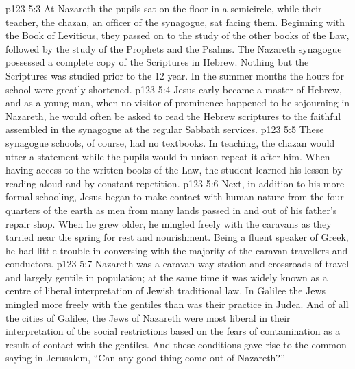 \vs p123 5:3 \pc At Nazareth the pupils sat on the floor in a semicircle, while their teacher, the chazan, an officer of the synagogue, sat facing them. Beginning with the Book of Leviticus, they passed on to the study of the other books of the Law, followed by the study of the Prophets and the Psalms. The Nazareth synagogue possessed a complete copy of the Scriptures in Hebrew. Nothing but the Scriptures was studied prior to the 12 year. In the summer months the hours for school were greatly shortened.
\vs p123 5:4 Jesus early became a master of Hebrew, and as a young man, when no visitor of prominence happened to be sojourning in Nazareth, he would often be asked to read the Hebrew scriptures to the faithful assembled in the synagogue at the regular Sabbath services.
\vs p123 5:5 These synagogue schools, of course, had no textbooks. In teaching, the chazan would utter a statement while the pupils would in unison repeat it after him. When having access to the written books of the Law, the student learned his lesson by reading aloud and by constant repetition.
\vs p123 5:6 \pc Next, in addition to his more formal schooling, Jesus began to make contact with human nature from the four quarters of the earth as men from many lands passed in and out of his father’s repair shop. When he grew older, he mingled freely with the caravans as they tarried near the spring for rest and nourishment. Being a fluent speaker of Greek, he had little trouble in conversing with the majority of the caravan travellers and conductors.
\vs p123 5:7 Nazareth was a caravan way station and crossroads of travel and largely gentile in population; at the same time it was widely known as a centre of liberal interpretation of Jewish traditional law. In Galilee the Jews mingled more freely with the gentiles than was their practice in Judea. And of all the cities of Galilee, the Jews of Nazareth were most liberal in their interpretation of the social restrictions based on the fears of contamination as a result of contact with the gentiles. And these conditions gave rise to the common saying in Jerusalem, “Can any good thing come out of Nazareth?”
